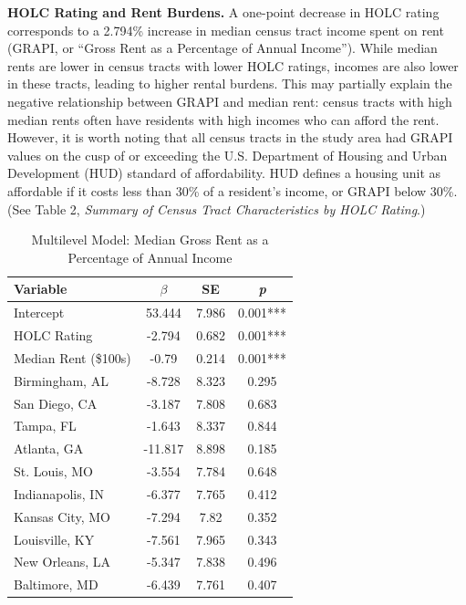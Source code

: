 \documentclass[paper=letter, fontsize=12pt]{scrartcl} %
\begin{document}
\begin{table}
	\textbf{HOLC Rating and Rent Burdens.} A one-point decrease in HOLC rating corresponds to a 2.794\% increase in median census tract income spent on rent (GRAPI, or ``Gross Rent as a Percentage of Annual Income''). While median rents are lower in census tracts with lower HOLC ratings, incomes are also lower in these tracts, leading to higher rental burdens. This may partially explain the negative relationship between GRAPI and median rent: census tracts with high median rents often have residents with high incomes who can afford the rent. However, it is worth noting that all census tracts in the study area had GRAPI values on the cusp of or exceeding the U.S. Department of Housing and Urban Development (HUD) standard of affordability. HUD defines a housing unit as affordable if it costs less than 30\% of a resident's income, or GRAPI below 30\%. (See Table 2, \textit{Summary of Census Tract Characteristics by HOLC Rating}.)
	\caption{Multilevel Model: Median Gross Rent as a Percentage of Annual Income}
	\begin{center}
		\begin{tabular}{|| l | c c c ||}
			\hline
			Variable & $\beta$ & SE & \textit{p} \\
			\hline \hline
			Intercept & 	53.444	 & 	7.986	 & 	0.001***	\\ 
			\hline 
			HOLC Rating & 	-2.794	 & 	0.682	 & 	0.001***	\\ 
			\hline 
			Median Rent (\$100s) & 	-0.79	 & 	0.214	 & 	0.001***	\\ 
			\hline 
			Birmingham, AL & 	-8.728	 & 	8.323	 & 	0.295	\\ 
			\hline 
			San Diego, CA & 	-3.187	 & 	7.808	 & 	0.683	\\ 
			\hline 
			Tampa, FL & 	-1.643	 & 	8.337	 & 	0.844	\\ 
			\hline 
			Atlanta, GA & 	-11.817	 & 	8.898	 & 	0.185	\\ 
			\hline 
			St. Louis, MO & 	-3.554	 & 	7.784	 & 	0.648	\\ 
			\hline 
			Indianapolis, IN & 	-6.377	 & 	7.765	 & 	0.412	\\ 
			\hline 
			Kansas City, MO & 	-7.294	 & 	7.82	 & 	0.352	\\ 
			\hline 
			Louisville, KY & 	-7.561	 & 	7.965	 & 	0.343	\\ 
			\hline 
			New Orleans, LA & 	-5.347	 & 	7.838	 & 	0.496	\\ 
			\hline 
			Baltimore, MD & 	-6.439	 & 	7.761	 & 	0.407	\\ 

\end{tabular}
\end{center}
\end{table}
\end{document}
